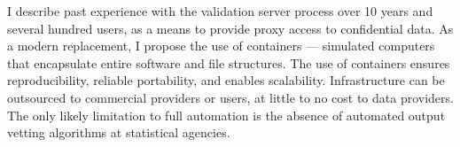 I describe past experience with the validation server process over 10 years and several hundred users, as a means to provide proxy access to confidential data. As a modern replacement, I propose the use of containers --- simulated computers that encapsulate entire software and file structures. The use of containers ensures reproducibility, reliable portability, and enables scalability. Infrastructure can be outsourced to commercial providers or users, at little to no cost to data providers. The only likely limitation to full automation is the absence of automated output vetting algorithms at statistical agencies.